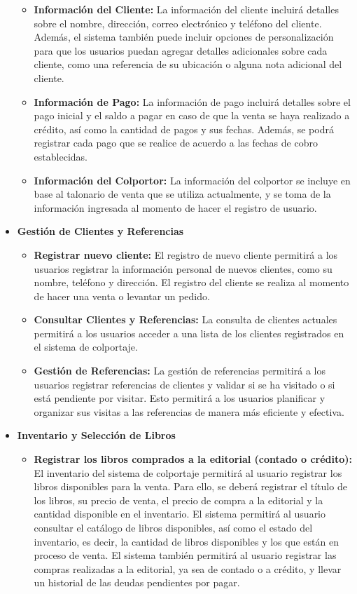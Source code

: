 \documentclass[runningheads]{llncs}
\begin{document}
\begin{itemize}
\begin{itemize}
        \item \textbf{Información del Cliente: }La información del cliente incluirá detalles sobre el nombre, dirección, correo electrónico y teléfono del cliente. Además, el sistema también puede incluir opciones de personalización para que los usuarios puedan agregar detalles adicionales sobre cada cliente, como una referencia de su ubicación o alguna nota adicional del cliente.
        \item \textbf{Información de Pago: }La información de pago incluirá detalles sobre el pago inicial y el saldo a pagar en caso de que la venta se haya realizado a crédito, así como la cantidad de pagos y sus fechas. Además, se podrá registrar cada pago que se realice de acuerdo a las fechas de cobro establecidas.
        \item \textbf{Información del Colportor: }La información del colportor se incluye en base al talonario de venta que se utiliza actualmente, y se toma de la información ingresada al momento de hacer el registro de usuario.
    \end{itemize}    
    \item \textbf{Gestión de Clientes y Referencias}
    \begin{itemize}
        \item \textbf{Registrar nuevo cliente: }El registro de nuevo cliente permitirá a los usuarios registrar la información personal de nuevos clientes, como su nombre, teléfono y dirección. El registro del cliente se realiza al momento de hacer una venta o levantar un pedido.
        \item \textbf{Consultar Clientes y Referencias: }La consulta de clientes actuales permitirá a los usuarios acceder a una lista de los clientes registrados en el sistema de colportaje.
        \item \textbf{Gestión de Referencias: }La gestión de referencias permitirá a los usuarios registrar referencias de clientes y validar si se ha visitado o si está pendiente por visitar. Esto permitirá a los usuarios planificar y organizar sus visitas a las referencias de manera más eficiente y efectiva.
    \end{itemize}    
    \item \textbf{Inventario y Selección de Libros}
    \begin{itemize}
        \item \textbf{Registrar los libros comprados a la editorial (contado o crédito): }El inventario del sistema de colportaje permitirá al usuario registrar los libros disponibles para la venta. Para ello, se deberá registrar el título de los libros, su precio de venta, el precio de compra a la editorial y la cantidad disponible en el inventario. El sistema permitirá al usuario consultar el catálogo de libros disponibles, así como el estado del inventario, es decir, la cantidad de libros disponibles y los que están en proceso de venta. El sistema también permitirá al usuario registrar las compras realizadas a la editorial, ya sea de contado o a crédito, y llevar un historial de las deudas pendientes por pagar.

\end{itemize}
\end{itemize}
\end{document}
